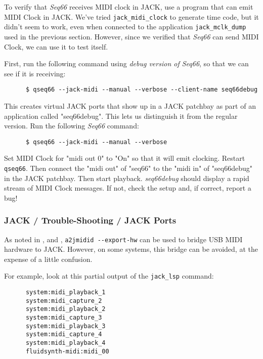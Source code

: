    To verify that \textsl{Seq66} receives MIDI clock in JACK, use a program
   that can emit MIDI Clock in JACK.
   We've tried \texttt{jack\_midi\_clock} to generate time code, but
   it didn't seem to work, even when connected to the
   application \texttt{jack\_mclk\_dump} used in the previous section.
   However, since we verified that \textsl{Seq66} can send MIDI Clock, we can
   use it to test itself.

   First, run the following command using \textsl{debug version of Seq66}, so
   that we can see if it is receiving:

   \begin{verbatim}
      $ qseq66 --jack-midi --manual --verbose --client-name seq66debug
   \end{verbatim}

   This creates virtual JACK ports that show up in a JACK patchbay as part of
   an application called "seq66debug".  This lets us distinguish it from
   the regular version.  Run the following \textsl{Seq66} command:

   \begin{verbatim}
      $ qseq66 --jack-midi --manual --verbose
   \end{verbatim}

   Set MIDI Clock for "midi out 0" to "On" so that it will emit clocking.
   Restart \texttt{qseq66}.
   Then connect the "midi out" of "seq66" to the "midi in" of "seq66debug"
   in the JACK patchbay.
   Then start playback.
   \textsl{seq66debug} should display a rapid stream of MIDI Clock messages.
   If not, check the setup and, if correct, report a bug!

\subsubsection{JACK / Trouble-Shooting / JACK Ports}
\label{subsubsec:jack_trouble_shooting_jack_ports}

   As noted in
   , and
   ,
   \texttt{a2jmidid -{}-export-hw} can be used to bridge USB MIDI
   hardware to JACK.  However, on some systems, this bridge can be
   avoided, at the expense of a little confusion.

   For example, look at this partial output of the \texttt{jack\_lsp}
   command:

   \begin{verbatim}
      system:midi_playback_1
      system:midi_capture_2
      system:midi_playback_2
      system:midi_capture_3
      system:midi_playback_3
      system:midi_capture_4
      system:midi_playback_4
      fluidsynth-midi:midi_00
   \end{verbatim}

